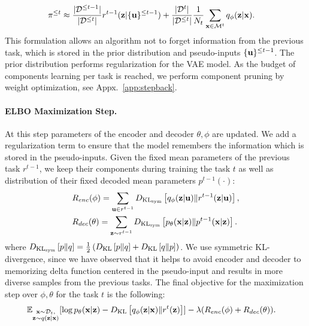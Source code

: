 \begin{equation}
\begin{aligned}
& \pi^{\leq t} \approx  \frac{|\mathcal{D}^{\leq t-1}|}{|\mathcal{D}^{\leq t}|} r^{t-1}({\mathbf{z}}|\{{\mathbf{u}}\}^{\leq t-1}) + \frac{|\mathcal{D}^{t}|}{|\mathcal{D}^{\leq t}|} \frac{1}{N_{t}}\sum_{{\mathbf{x}} \in  \mathcal{M}^t} q_{\phi}({\mathbf{z}}|{\mathbf{x}}).
\end{aligned}
\end{equation}
This formulation allows an algorithm not to forget information from the previous task, which is stored in the prior distribution and pseudo-inputs $\{{\mathbf{u}}\}^{\leq t-1}$. The prior distribution performs regularization for the VAE model. As the budget of components learning per task is reached, we perform component pruning by weight optimization, see Appx.~\ref{app:stepback}.
\paragraph{ELBO Maximization Step.} At this step parameters of the encoder and decoder $\theta,\phi$ are updated. We add a regularization term to ensure that the model remembers the information which is stored in the pseudo-inputs. Given the fixed mean parameters of the previous task $r^{t-1}$, we keep their components during training the task $t$ as well as distribution of their fixed decoded mean parameters $p^{t-1}(\cdot)$:
\begin{align}\label{eq:reqularizers}
   & R_{enc}(\phi)=\sum_{\rvu\in r^{t-1}}\KLsym{q_{\phi}(\rvz|\rvu)}{r^{t-1}(\rvz|\rvu)}, \\ 
   & R_{dec}(\theta)=\sum_{\rvz \sim r^{t-1}}\KLsym{p_\theta(\rvx|\rvz)}{p^{t-1}(\rvx|\rvz)}.
\end{align}
where $D_{\mathrm{KL}_{\text{sym}}}\left[p\|q\right] = \tfrac12\left(D_{\mathrm{KL}}\left[p\|q\right] + D_{\mathrm{KL}}\left[q\|p\right]\right)$. We use symmetric KL-divergence, since we have observed that it helps to avoid encoder and decoder to memorizing delta function centered in the pseudo-input and results in more diverse samples from the previous tasks. 
The final objective for the maximization step over $\phi, \theta$ for the task $t$ is the following:
\begin{equation} \label{eq:obj_with_reg}
    \begin{aligned}
    & \E_{\substack{\rvx\sim\train_t,\\\rvz\sim q(\rvz|\rvx)}}[\log p_{\theta}(\rvx|\rvz) - \KL{q_{\phi}(\rvz|\rvx)}{r^{t}(\rvz)}] - \lambda (R_{enc}(\phi) + R_{dec}(\theta)).
    \end{aligned}
\end{equation}

